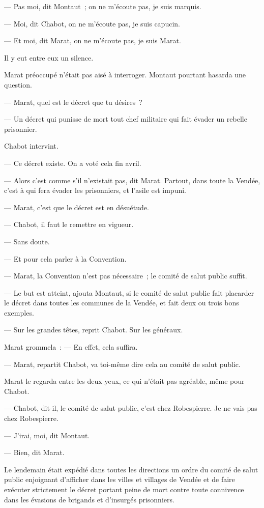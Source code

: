 \documentclass[french,twoside]{book} %
\begin{document}
— Pas moi, dit Montaut ; on ne m’écoute pas, je suis marquis.\par
 — Moi, dit Chabot, on ne m’écoute pas, je suis capucin.\par
— Et moi, dit Marat, on ne m’écoute pas, je suis Marat.\par
Il y eut entre eux un silence.\par
Marat préoccupé n’était pas aisé à interroger. Montaut pourtant hasarda une question.\par
— Marat, quel est le décret que tu désires ?\par
— Un décret qui punisse de mort tout chef militaire qui fait évader un rebelle prisonnier.\par
Chabot intervint.\par
— Ce décret existe. On a voté cela fin avril.\par
— Alors c’est comme s’il n’existait pas, dit Marat. Partout, dans toute la Vendée, c’est à qui fera évader les prisonniers, et l’asile est impuni.\par
— Marat, c’est que le décret est en désuétude.\par
— Chabot, il faut le remettre en vigueur.\par
— Sans doute.\par
— Et pour cela parler à la Convention.\par
— Marat, la Convention n’est pas nécessaire ; le comité de salut public suffit.\par
— Le but est atteint, ajouta Montaut, si le comité de salut public fait placarder le décret dans toutes les communes de la Vendée, et fait deux ou trois bons exemples.\par
— Sur les grandes têtes, reprit Chabot. Sur les généraux.\par
Marat grommela : — En effet, cela suffira.\par
— Marat, repartit Chabot, va toi-même dire cela au comité de salut public.\par
 Marat le regarda entre les deux yeux, ce qui n’était pas agréable, même pour Chabot.\par
— Chabot, dit-il, le comité de salut public, c’est chez Robespierre. Je ne vais pas chez Robespierre.\par
— J’irai, moi, dit Montaut.\par
— Bien, dit Marat.\par
Le lendemain était expédié dans toutes les directions un ordre du comité de salut public enjoignant d’afficher dans les villes et villages de Vendée et de faire exécuter strictement le décret portant peine de mort contre toute connivence dans les évasions de brigands et d’insurgés prisonniers.\par
\end{document}
